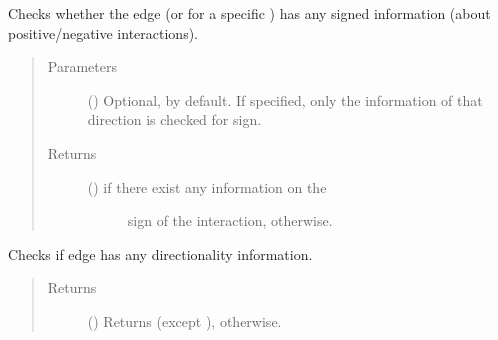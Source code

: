 \documentclass[letterpaper,10pt,english]{sphinxmanual}
\begin{document}
\begin{fulllineitems}
\begin{fulllineitems}
\end{fulllineitems}


\begin{fulllineitems}
\label{\detokenize{main:pypath.main.Direction.has_sign}}
Checks whether the edge (or for a specific ) has
any signed information (about positive/negative interactions).
\begin{quote}\begin{description}
\item[{Parameters}] \leavevmode
{} () \textendash{} Optional,  by default. If specified, only the
information of that direction is checked for sign.

\item[{Returns}] \leavevmode
\begin{description}
\item[{() \textendash{}  if there exist any information on the}] \leavevmode
sign of the interaction,  otherwise.

\end{description}


\end{description}\end{quote}

\end{fulllineitems}


\begin{fulllineitems}
\label{\detokenize{main:pypath.main.Direction.is_directed}}
Checks if edge has any directionality information.
\begin{quote}\begin{description}
\item[{Returns}] \leavevmode
() \textendash{} Returns  (except ),
 otherwise.


\end{description}
\end{quote}
\end{fulllineitems}
\end{fulllineitems}
\end{document}
